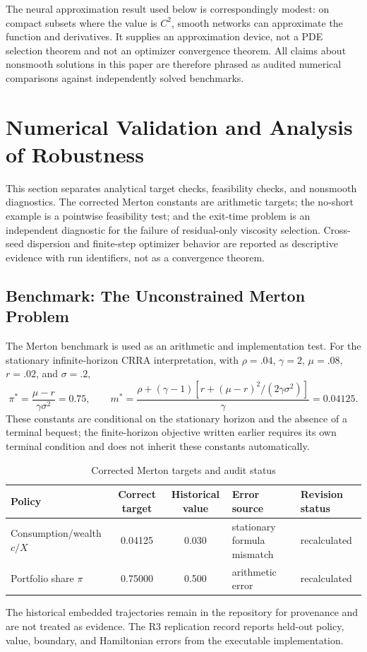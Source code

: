\documentclass[ecta]{econsocart}
\theoremstyle{plain}
\theoremstyle{remark}
\begin{document}
The neural approximation result used below is correspondingly modest: on compact subsets where the value is $C^2$, smooth networks can approximate the function and derivatives. It supplies an approximation device, not a PDE selection theorem and not an optimizer convergence theorem. All claims about nonsmooth solutions in this paper are therefore phrased as audited numerical comparisons against independently solved benchmarks.

\section{Numerical Validation and Analysis of Robustness}
\label{sec:validation}

This section separates analytical target checks, feasibility checks, and nonsmooth diagnostics. The corrected Merton constants are arithmetic targets; the no-short example is a pointwise feasibility test; and the exit-time problem is an independent diagnostic for the failure of residual-only viscosity selection. Cross-seed dispersion and finite-step optimizer behavior are reported as descriptive evidence with run identifiers, not as a convergence theorem.

\subsection{Benchmark: The Unconstrained Merton Problem}
The Merton benchmark is used as an arithmetic and implementation test. For the stationary infinite-horizon CRRA interpretation, with $\rho=.04$, $\gamma=2$, $\mu=.08$, $r=.02$, and $\sigma=.2$,
\[
\pi^*=\frac{\mu-r}{\gamma\sigma^2}=0.75,
\qquad
m^*=\frac{\rho+(\gamma-1)\left[r+(\mu-r)^2/(2\gamma\sigma^2)\right]}{\gamma}=0.04125.
\]
These constants are conditional on the stationary horizon and the absence of a terminal bequest; the finite-horizon objective written earlier requires its own terminal condition and does not inherit these constants automatically.

\begin{table}[H]
\centering
\begin{threeparttable}
\caption{Corrected Merton targets and audit status}
\label{tab:merton_results}
\small
\setlength{\tabcolsep}{3pt}
\begin{tabularx}{\textwidth}{@{}lccXX@{}}
\toprule
Policy & Correct target & Historical value & Error source & Revision status\\
\midrule
Consumption/wealth $c/X$ & 0.04125 & 0.030 & stationary formula mismatch & recalculated\\
Portfolio share $\pi$ & 0.75000 & 0.500 & arithmetic error & recalculated\\
\bottomrule
\end{tabularx}
\begin{tablenotes}
\small The historical embedded trajectories remain in the repository for provenance and are not treated as evidence. The R3 replication record reports held-out policy, value, boundary, and Hamiltonian errors from the executable implementation.
\end{tablenotes}
\end{threeparttable}
\end{table}
\end{document}
